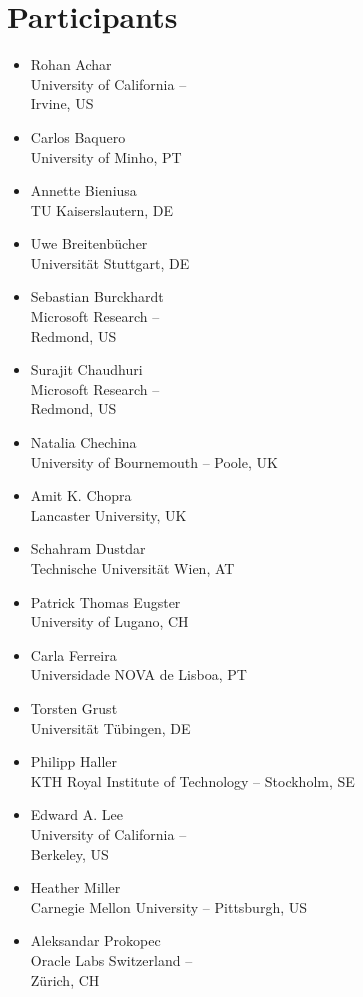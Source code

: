 \documentclass[a4paper,UKenglish]{dagrep-v2018}
\begin{document}
\section{Participants}
\begin{multicols}{3}
  \begin{itemize}
  \item Rohan Achar\\University of California -- \\Irvine, US
  \item Carlos Baquero\\University of Minho, PT
  \item Annette Bieniusa\\TU Kaiserslautern, DE
  \item Uwe Breitenb{\"u}cher\\Universit{\"a}t Stuttgart, DE
  \item Sebastian Burckhardt\\Microsoft Research -- \\Redmond, US
  \item Surajit Chaudhuri\\Microsoft Research -- \\Redmond, US
  \item Natalia Chechina\\University of Bournemouth -- Poole, UK
  \item Amit K. Chopra\\Lancaster University, UK
  \item Schahram Dustdar\\Technische Universit{\"a}t Wien, AT
  \item Patrick Thomas Eugster\\University of Lugano, CH
  \item Carla Ferreira\\Universidade NOVA de Lisboa, PT
  \item Torsten Grust\\Universit{\"a}t T{\"u}bingen, DE
  \item Philipp Haller\\KTH Royal Institute of Technology -- Stockholm, SE
  \item Edward A. Lee\\University of California -- \\Berkeley, US
  \item Heather Miller\\Carnegie Mellon University -- Pittsburgh, US
  \item Aleksandar Prokopec\\Oracle Labs Switzerland -- \\Z{\"u}rich, CH

\end{itemize}
\end{multicols}
\end{document}
